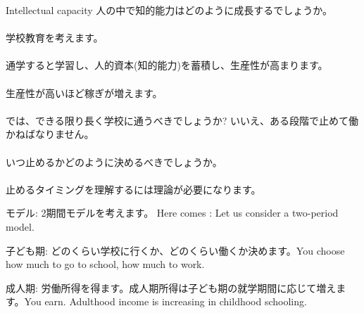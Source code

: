 \begin{frame}[label=IntellectualProperty]{Intellectual capacity}
人の中で知的能力はどのように成長するでしょうか。
\\~\\
\pause
学校教育を考えます。%
\\~\\
\pause
通学すると学習し、人的資本(知的能力)を蓄積し、生産性が高まります。%
\\~\\
\pause
生産性が高いほど稼ぎが増えます。%
\\~\\
\pause
では、できる限り長く学校に通うべきでしょうか? %
\pause
いいえ、ある段階で止めて働かねばなりません。%
\\~\\
\pause
いつ止めるかどのように決めるべきでしょうか。%
\\~\\
\pause
止めるタイミングを理解するには理論が必要になります。%
\end{frame}

\begin{frame}[label=BalandRobinson]{}
\citet{BalandRobinson2000}モデル: 2期間モデルを考えます。
Here comes \citet{BalandRobinson2000}: Let us consider a two-period model.

\begin{description}
\vspace{1.0ex}\setlength{\itemsep}{1.0ex}\setlength{\baselineskip}{12pt}
\pause
\item[第1期]	子ども期: どのくらい学校に行くか、どのくらい働くか決めます。You choose how much to go to school, how much to work.
\pause
\item[第2期]	成人期: 労働所得を得ます。成人期所得は子ども期の就学期間に応じて増えます。You earn. Adulthood income is increasing in childhood schooling.
\end{description}
\end{frame}

